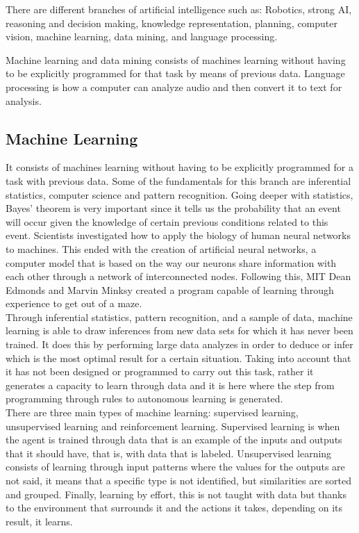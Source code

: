 \documentclass[sigconf,12pt,review=false,natbib=false]{acmart}
\begin{document}
There are different branches of artificial intelligence such as: Robotics, strong AI, reasoning and decision
making, knowledge representation, planning, computer vision, machine learning, data mining, and language processing.

Machine learning and data mining consists of machines learning without having to be explicitly programmed for
that task by means of previous data. Language processing is how a computer can analyze audio and then convert it
to text for analysis. 


\subsection{Machine Learning}

It consists of machines learning without having to be explicitly programmed for a task with previous data.
Some of the fundamentals for this branch are inferential statistics, computer science and pattern recognition.
Going deeper with statistics, Bayes' theorem is very important since it tells us the probability that an event will
occur given the knowledge of certain previous conditions related to this event.
Scientists investigated how to apply the biology of human neural networks to machines. This ended with the creation
of artificial neural networks, a computer model that is based on the way our neurons share information with each other
through a network of interconnected nodes. Following this, MIT Dean Edmonds and Marvin Minksy created a program
capable of learning through experience to get out of a maze. \\

Through inferential statistics, pattern recognition, and a sample of data, machine learning is able to draw inferences
from new data sets for which it has never been trained. It does this by performing large data analyzes in order to
deduce or infer which is the most optimal result for a certain situation. Taking into account that it has not been
designed or programmed to carry out this task, rather it generates a capacity to learn through data and it is here
where the step from programming through rules to autonomous learning is generated. \\

There are three main types of machine learning: supervised learning, unsupervised learning and reinforcement learning.
Supervised learning is when the agent is trained through data that is an example of the inputs and outputs that it
should have, that is, with data that is labeled. 
Unsupervised learning consists of learning through input patterns where the values for the outputs are not said,
it means that a specific type is not identified, but similarities are sorted and grouped. 
Finally, learning by effort, this is not taught with data but thanks to the environment that surrounds it and the
actions it takes, depending on its result, it learns.
\end{document}
